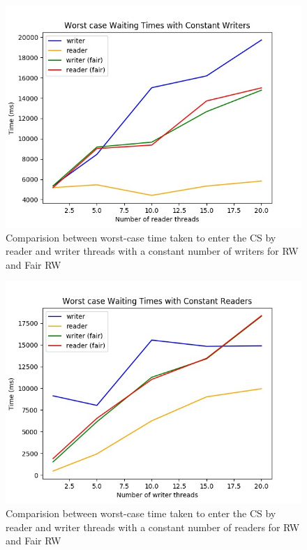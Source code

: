 \documentclass[12pt]{article}
\begin{document}
\newpage

\begin{figure}[ht!]
\includegraphics[width=150mm]{3rd.jpg}
\caption{Comparision between worst-case time taken to
enter the CS by reader and writer threads with a constant number of writers for RW and Fair RW}
\end{figure}

\newpage

\begin{figure}[ht!]
\includegraphics[width=150mm]{4th.jpg}
\caption{Comparision between worst-case time taken to
enter the CS by reader and writer threads with a constant number of readers for RW and Fair RW}
\end{figure}
\end{document}

